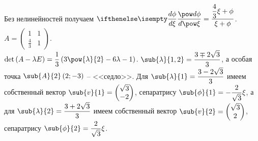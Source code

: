 \documentclass[a5paper,10pt]{article}
\begin{document}
\begin{enumerate}
    Без нелинейностей получаем 
    $\der{\phi}{\xi} = \dfrac {\dfrac {4} {3} \xi + \phi} {\xi + \phi}$.
    $A = \begin{pmatrix} 1 & 1 \\ \frac {4} {3} & 1 \end{pmatrix}$. \\
    $\det\br{A - \lambda E} = \dfrac {1} {3} \br{3\pow{\lambda}{2} - 6\lambda - 1}$.
    $\sub{\lambda}{1,2} = \dfrac {3 \mp 2\sqrt{3}} {3}$, а особая точка $\sub{A}{2}\br{2; -3}$
    -- <<седло>>.    
    Для $\sub{\lambda}{1} = \dfrac {3 - 2\sqrt{3}} {3}$ имеем собственный вектор
    $\sub{v}{1} = \begin{pmatrix} \sqrt{3} \\ -2 \end{pmatrix}$,
    сепаратрису $\sub{\phi}{1} = -\dfrac {2} {\sqrt{3}} \xi$,
    а для $\sub{\lambda}{2} = \dfrac {3 + 2\sqrt{3}} {3}$
    имеем собственный вектор $\sub{v}{2} = \begin{pmatrix} \sqrt{3} \\ 2 \end{pmatrix}$,
    сепаратрису $\sub{\phi}{2} = \dfrac {2} {\sqrt{3}} \xi$.
\end{enumerate}
\end{document}
